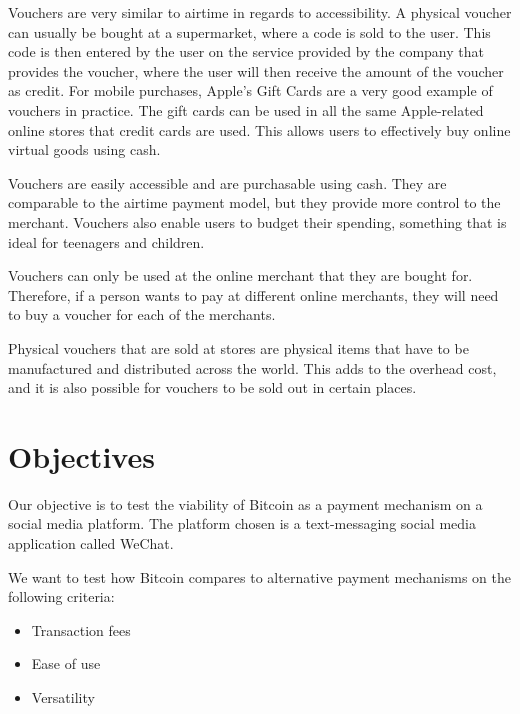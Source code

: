 Vouchers are very similar to airtime in regards to accessibility. A physical voucher can usually be bought at a supermarket, where a code is sold to the user. This code is then entered by the user on the service provided by the company that provides the voucher, where the user will then receive the amount of the voucher as credit. For mobile purchases, Apple's Gift Cards are a very good example of vouchers in practice. The gift cards can be used in all the same Apple-related online stores that credit cards are used. This allows users to effectively buy online virtual goods using cash.


Vouchers are easily accessible and are purchasable using cash. They are comparable to the airtime payment model, but they provide more control to the merchant. Vouchers also enable users to budget their spending, something that is ideal for teenagers and children.


Vouchers can only be used at the online merchant that they are bought for. Therefore, if a person wants to pay at different online merchants, they will need to buy a voucher for each of the merchants. 

Physical vouchers that are sold at stores are physical items that have to be manufactured and distributed across the world. This adds to the overhead cost, and it is also possible for vouchers to be sold out in certain places.

\section{Objectives}

Our objective is to test the viability of Bitcoin as a payment mechanism on a social media platform. The platform chosen is a text-messaging social media application called WeChat.

We want to test how Bitcoin compares to alternative payment mechanisms on the following criteria:

\begin{itemize}
	\item{Transaction fees}
	\item{Ease of use}
	\item{Versatility}
\end{itemize}

